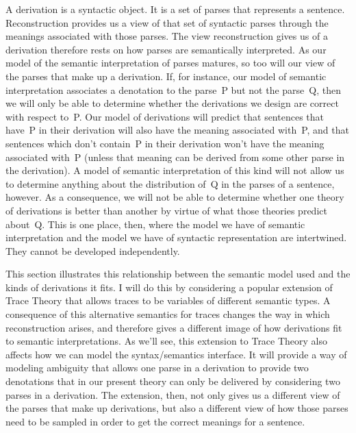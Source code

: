 A derivation is a syntactic object. It is a set of parses that represents a sentence. Reconstruction provides us a view of that set of syntactic parses through the meanings associated with those parses. The view reconstruction gives us of a derivation therefore rests on how parses are semantically interpreted. As our model of the semantic interpretation of parses matures, so too will our view of the parses that make up a derivation. If, for instance, our model of semantic interpretation associates a denotation to the parse~P but not the parse~Q, then we will only be able to determine whether the derivations we design are correct with respect to~P. Our model of derivations will predict that sentences that have~P in their derivation will also have the meaning associated with~P, and that sentences which don't contain~P in their derivation won't have the meaning associated with~P (unless that meaning can be derived from some other parse in the derivation). A model of semantic interpretation of this kind will not allow us to determine anything about the distribution of~Q in the parses of a sentence, however. As a consequence, we will not be able to determine whether one theory of derivations is better than another by virtue of what those theories predict about~Q. This is one place, then, where the model we have of semantic interpretation and the model we have of syntactic representation are intertwined. They cannot be developed independently.

This section illustrates this relationship between the semantic model used and the kinds of derivations it fits. I will do this by considering a popular extension of Trace Theory that allows traces to be variables of different semantic types. %
%
%
%
A consequence of this alternative semantics for traces changes the way in which reconstruction arises, and therefore gives a different image of how derivations fit to semantic interpretations. As we'll see, this extension to Trace Theory also affects how we can model the syntax/semantics interface. It will provide a way of modeling ambiguity that allows one parse in a derivation to provide two denotations that in our present theory can only be delivered by considering two parses in a derivation. The extension, then, not only gives us a different view of the parses that make up derivations, but also a different view of how those parses need to be sampled in order to get the correct meanings for a sentence. 

